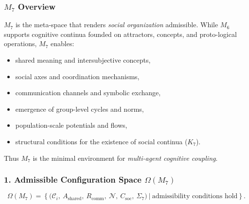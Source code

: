 

\subsubsection{\texorpdfstring{$M_7$}{M_7} Overview}
\label{sec:m7-overview}

$M_7$ is the meta-space that renders \emph{social organization} admissible.
While $M_6$ supports cognitive continua founded on attractors, concepts, and
proto-logical operations, $M_7$ enables:

\begin{itemize}
    \item shared meaning and intersubjective concepts,
    \item social axes and coordination mechanisms,
    \item communication channels and symbolic exchange,
    \item emergence of group-level cycles and norms,
    \item population-scale potentials and flows,
    \item structural conditions for the existence of social continua ($K_7$).
\end{itemize}

Thus $M_7$ is the minimal environment for \emph{multi-agent cognitive coupling}.

\subsubsection*{1. Admissible Configuration Space \texorpdfstring{$\Omega(M_7)$}{\Omega(M_7)}}

\[
\Omega(M_7)=
\left\{
\big(
\mathcal{C}_i,\
A_{\mathrm{shared}},\
R_{\mathrm{comm}},\
\mathcal{N},\
C_{\mathrm{soc}},\
\Sigma_7
\big)
\ \big| \ \text{admissibility conditions hold}
\right\}.
\]

